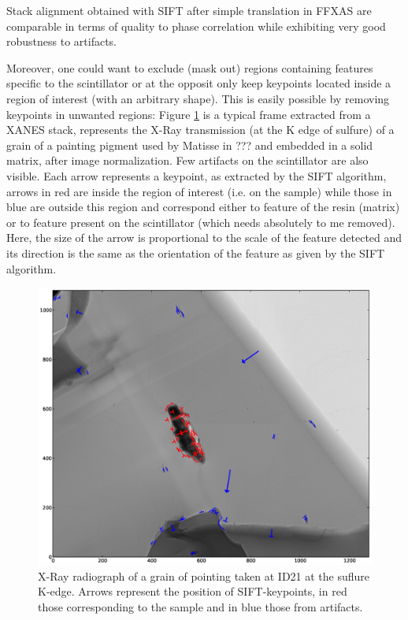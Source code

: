 \documentclass[preprint]{iucr}
\begin{document}
Stack alignment obtained with SIFT after simple translation in FFXAS are
comparable in terms of quality to phase correlation while exhibiting very good
robustness to artifacts.
 
Moreover, one could want to exclude (mask out) regions containing features
specific to the scintillator or at the opposit only keep keypoints located
inside a region of interest (with an arbitrary shape). 
This is easily possible by removing keypoints in unwanted regions:
Figure \ref{sample} is a typical frame extracted from a XANES stack, 
represents the X-Ray
transmission (at the K edge of sulfure) of a grain of a painting pigment used by Matisse in ??? and embedded in a solid
matrix, after image normalization.  
Few artifacts on the scintillator are also visible. 
Each arrow represents a keypoint, as extracted by the SIFT algorithm, arrows in
red are inside the region of interest (i.e. on the sample) 
while those in blue are outside this region and
correspond either to feature of the resin (matrix) or to feature present on the
scintillator (which needs absolutely to me removed).
Here, the size of the arrow is proportional to the scale of the feature
detected and its direction is the same as the orientation of the feature as
given by the SIFT algorithm.
 
\begin{figure}
\begin{center}
\includegraphics[width=15cm]{features.eps}
\caption{\label{sample} X-Ray radiograph of a grain of pointing taken at ID21 at
the suflure K-edge. Arrows represent the position of SIFT-keypoints, in red
those corresponding to the sample and in blue those from artifacts.}
\end{center}
\end{figure}
\end{document}
